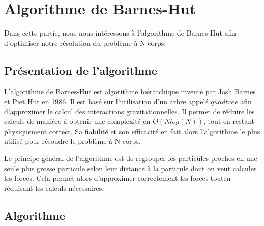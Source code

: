 \chapter{Algorithme de Barnes-Hut}

Dans cette partie, nous nous intéressons à l'algorithme de Barnes-Hut afin d'optimiser notre résolution du problème à N-corps.

\section{Présentation de l'algorithme}

L'algorithme de Barnes-Hut est algorithme hiérarchique inventé par Josh Barnes et Piet Hut en 1986. Il est basé sur l'utilisation d'un arbre appelé $quadtree$ afin d'approximer le calcul des  interactions gravitationnelles. Il permet de réduire les calculs de manière à obtenir une complexité en $O(Nlog(N))$, tout en restant physiquement correct. Sa fiabilité et son efficacité en fait alors l'algorithme le plus utilisé pour résoudre le problème à N corps.
 

Le principe général de l'algorithme est de regrouper les particules proches en une seule plus grosse particule selon leur distance  à la particule dont on veut calculer les forces. Cela permet alors d'approximer correctement les forces touten réduisant les calculs nécessaires.


\section{Algorithme}
